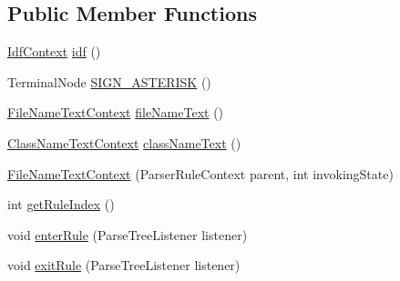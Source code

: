 \subsection*{Public Member Functions}
\begin{DoxyCompactItemize}
\item 
\hyperlink{classgov_1_1nasa_1_1jpf_1_1inspector_1_1server_1_1expression_1_1parser_1_1_expression_grammar_parser_1_1_idf_context}{Idf\+Context} \hyperlink{classgov_1_1nasa_1_1jpf_1_1inspector_1_1server_1_1expression_1_1parser_1_1_expression_grammar_parser_1_1_file_name_text_context_a493f2a1b74d6c28bc598a52badbb5a8c}{idf} ()
\item 
Terminal\+Node \hyperlink{classgov_1_1nasa_1_1jpf_1_1inspector_1_1server_1_1expression_1_1parser_1_1_expression_grammar_parser_1_1_file_name_text_context_a495c4c6ff54ac4579e3634cb9037dc7c}{S\+I\+G\+N\+\_\+\+A\+S\+T\+E\+R\+I\+SK} ()
\item 
\hyperlink{classgov_1_1nasa_1_1jpf_1_1inspector_1_1server_1_1expression_1_1parser_1_1_expression_grammar_parser_1_1_file_name_text_context}{File\+Name\+Text\+Context} \hyperlink{classgov_1_1nasa_1_1jpf_1_1inspector_1_1server_1_1expression_1_1parser_1_1_expression_grammar_parser_1_1_file_name_text_context_a2a674c665fe1eb902bc068901c3ee3dd}{file\+Name\+Text} ()
\item 
\hyperlink{classgov_1_1nasa_1_1jpf_1_1inspector_1_1server_1_1expression_1_1parser_1_1_expression_grammar_pa73f78f15ab35f00cdc76079d9a864524}{Class\+Name\+Text\+Context} \hyperlink{classgov_1_1nasa_1_1jpf_1_1inspector_1_1server_1_1expression_1_1parser_1_1_expression_grammar_parser_1_1_file_name_text_context_a549c9d1e33b69a3db32c1e67b335a33d}{class\+Name\+Text} ()
\item 
\hyperlink{classgov_1_1nasa_1_1jpf_1_1inspector_1_1server_1_1expression_1_1parser_1_1_expression_grammar_parser_1_1_file_name_text_context_a4ad1d49f6abe14919216700e3af793b0}{File\+Name\+Text\+Context} (Parser\+Rule\+Context parent, int invoking\+State)
\item 
int \hyperlink{classgov_1_1nasa_1_1jpf_1_1inspector_1_1server_1_1expression_1_1parser_1_1_expression_grammar_parser_1_1_file_name_text_context_af7fd27ff6d0a90378a9deed7e20b6c8b}{get\+Rule\+Index} ()
\item 
void \hyperlink{classgov_1_1nasa_1_1jpf_1_1inspector_1_1server_1_1expression_1_1parser_1_1_expression_grammar_parser_1_1_file_name_text_context_aac6a6702b109c42e2d2d22fa5fc2259b}{enter\+Rule} (Parse\+Tree\+Listener listener)
\item 
void \hyperlink{classgov_1_1nasa_1_1jpf_1_1inspector_1_1server_1_1expression_1_1parser_1_1_expression_grammar_parser_1_1_file_name_text_context_acced89970e9703bfd9d5b6ae1bdfbc01}{exit\+Rule} (Parse\+Tree\+Listener listener)
\end{DoxyCompactItemize}


